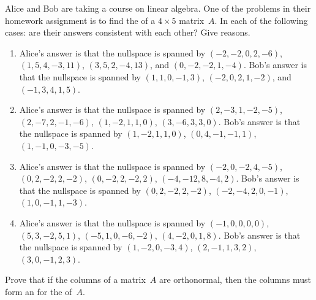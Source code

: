 \begin{exercise}  
Alice and Bob are taking a course on linear algebra. 
One of the problems in their homework assignment is to find the  of a \(4\times5\) matrix~\(A\). 
In each of the following cases: are their answers consistent with each other?
Give reasons.
\begin{enumerate} \sloppy
\item Alice's answer is that the nullspace is spanned by 
\((-2, -2, 0, 2, -6)\), \((1, 5, 4, -3, 11)\), \((3, 5, 2, -4, 13)\), and \((0, -2, -2, 1, -4)\). 
Bob's answer is that the nullspace is spanned by 
\((1, 1, 0, -1, 3)\), \((-2, 0, 2, 1, -2)\), and \((-1, 3, 4, 1, 5)\).%

\item Alice's answer is that the nullspace is spanned by 
\((2,-3,1,-2,-5)\), 
\((2,-7,2,-1,-6)\), 
\((1,-2,1,1,0)\), 
\((3,-6,3,3,0)\). 
Bob's answer is that the nullspace is spanned by 
\((1,-2,1,1,0)\), 
\((0,4,-1,-1,1)\), 
\((1,-1,0,-3,-5)\).%

\item Alice's answer is that the nullspace is spanned by 
\((-2,0,-2,4,-5)\), 
\((0,2,-2,2,-2)\), 
\((0,-2,2,-2,2)\), 
\((-4,-12,8,-4,2)\). 
Bob's answer is that the nullspace is spanned by 
\((0,2,-2,2,-2)\), 
\((-2,-4,2,0,-1)\), 
\((1,0,-1,1,-3)\).%

\item Alice's answer is that the nullspace is spanned by 
\((-1,0,0,0,0)\), 
\((5,3,-2,5,1)\), 
\((-5,1,0,-6,-2)\), 
\((4,-2,0,1,8)\). 
Bob's answer is that the nullspace is spanned by 
\((1,-2,0,-3,4)\), 
\((2,-1,1,3,2)\), 
\((3,0,-1,2,3)\).%

\end{enumerate}
\end{exercise}










\begin{exercise}  
Prove that if the columns of a matrix~\(A\) are orthonormal, then the columns must form an  for the  of~\(A\).
\end{exercise}




